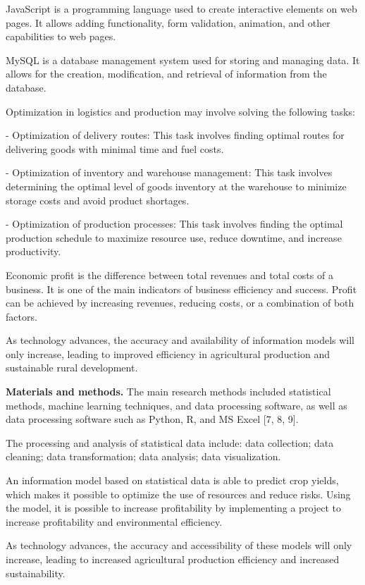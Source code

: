 \begin{multicols}{2}
JavaScript is a programming language used to create interactive elements
on web pages. It allows adding functionality, form validation,
animation, and other capabilities to web pages.

MySQL is a database management system used for storing and managing
data. It allows for the creation, modification, and retrieval of
information from the database.

Optimization in logistics and production may involve solving the
following tasks:

- Optimization of delivery routes: This task involves finding optimal
routes for delivering goods with minimal time and fuel costs.

- Optimization of inventory and warehouse management: This task involves
determining the optimal level of goods inventory at the warehouse to
minimize storage costs and avoid product shortages.

- Optimization of production processes: This task involves finding the
optimal production schedule to maximize resource use, reduce downtime,
and increase productivity.

Economic profit is the difference between total revenues and total costs
of a business. It is one of the main indicators of business efficiency
and success. Profit can be achieved by increasing revenues, reducing
costs, or a combination of both factors.

As technology advances, the accuracy and availability of information
models will only increase, leading to improved efficiency in
agricultural production and sustainable rural development.

{\bfseries Materials and methods.} The main research methods included
statistical methods, machine learning techniques, and data processing
software, as well as data processing software such as Python, R, and MS
Excel {[}7, 8, 9{]}.

The processing and analysis of statistical data include: data
collection; data cleaning; data transformation; data analysis; data
visualization.

An information model based on statistical data is able to predict crop
yields, which makes it possible to optimize the use of resources and
reduce risks. Using the model, it is possible to increase profitability
by implementing a project to increase profitability and environmental
efficiency.

As technology advances, the accuracy and accessibility of these models
will only increase, leading to increased agricultural production
efficiency and increased sustainability.


\end{multicols}
